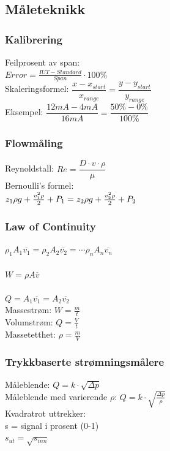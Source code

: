 \documentclass[10pt,a5paper]{article}
\begin{document}
\subsection{Måleteknikk}
\subsubsection*{Kalibrering}
Feilprosent av span:\\
$Error=\frac {IUT-Standard}{Span} \cdot 100\% $\\
\vskip 2.5pt 
Skaleringsformel:
\vskip 2.5pt 
$\dfrac{x-x_{start}}{x_{range}}=\dfrac{y-y_{start}}{y_{range}}$\\
Eksempel: $\dfrac{12mA-4mA}{16mA}=\dfrac{50\%-0\%}{100\%}$
\subsubsection*{Flowmåling}
\vskip 2.5pt 
\vskip 2.5pt 
\vskip 2.5pt 
Reynoldstall: $Re=\dfrac {D \cdot v \cdot \rho}{\mu}$\\
\vskip 2.5pt 
Bernoulli's formel:\\
$z_1 \rho g + {v_1^2 \rho \over 2} + P_1 = z_2 \rho g + {v_2^2 \rho \over 2} + P_2$\\
\vskip 2.5pt 
\subsubsection*{Law of Continuity}
$\rho_1 A_1 \overline{v_1} = \rho_2 A_2 \overline{v_2} = \cdots \rho_n A_n \overline{v_n}$\\
\\
$W = \rho A \overline{v}$\\\\
$Q=A_1 \overline{v_1} = A_2 \overline{v_2}$\\

Massestrøm: $W=\frac{m}{t}$\\
\vskip 2.5pt 
Volumstrøm: $Q=\frac{V}{t}$\\
\vskip 2.5pt 
Massetetthet: $\rho=\frac{m}{V}$\\
\vskip 2.5pt 
\subsubsection*{Trykkbaserte strømningsmålere}
Måleblende: $Q=k\cdot \sqrt{\Delta p}$\\
\vskip 2.5pt 
Måleblende med varierende $\rho$: $Q=k\cdot \sqrt{\frac{\Delta p}{\rho}}$\\
\vskip 2.5pt
Kvadratrot uttrekker:\\
s = signal i prosent (0-1)\\
$s_{ut}=\sqrt{s_{inn}}$\\
\end{document}
